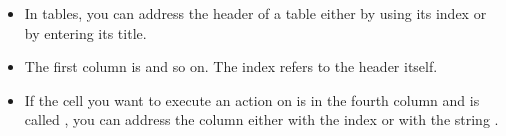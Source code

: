 \begin{itemize}
\item In tables, you can address the header of a table either by using its index or by entering its title. 
\item The first column is  and so on. The index  refers to the header itself. 
\item If the cell you want to execute an action on is in the fourth column and is called , you can address the column either with the index  or with the string . 

\end{itemize}   

